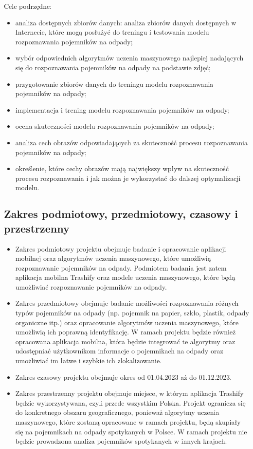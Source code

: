 \documentclass[12pt, a4paper, twoside, openany]{book}
\begin{document}
Cele podrzędne:
\begin{itemize}
    \item analiza dostępnych zbiorów danych: analiza zbiorów danych dostępnych w Internecie, które mogą posłużyć do treningu i testowania modelu rozpoznawania pojemników na odpady;
    \item wybór odpowiednich algorytmów uczenia maszynowego najlepiej nadających się do rozpoznawania pojemników na odpady na podstawie zdjęć;
    \item przygotowanie zbiorów danych do treningu modelu rozpoznawania pojemników na odpady;
    \item implementacja i trening modelu rozpoznawania pojemników na odpady;
    \item ocena skuteczności modelu rozpoznawania pojemników na odpady;
    \item analiza cech obrazów odpowiadających za skuteczność procesu rozpoznawania pojemników na odpady;
    \item określenie, które cechy obrazów mają największy wpływ na skuteczność procesu rozpoznawania i jak można je wykorzystać do dalszej optymalizacji modelu.
\end{itemize}

\subsection{Zakres podmiotowy, przedmiotowy, czasowy i przestrzenny}

\begin{itemize}
    \item Zakres podmiotowy projektu \topic  obejmuje badanie i opracowanie aplikacji mobilnej oraz algorytmów uczenia maszynowego, które umożliwią rozpoznawanie pojemników na odpady. Podmiotem badania jest zatem aplikacja mobilna Trashify oraz modele uczenia maszynowego, które będą umożliwiać rozpoznawanie pojemników na odpady.
    \item Zakres przedmiotowy obejmuje badanie możliwości rozpoznawania różnych typów pojemników na odpady (np. pojemnik na papier, szkło, plastik, odpady organiczne itp.) oraz opracowanie algorytmów uczenia maszynowego, które umożliwią ich poprawną identyfikację. W ramach projektu będzie również opracowana aplikacja mobilna, która będzie integrować te algorytmy oraz udostępniać użytkownikom informacje o pojemnikach na odpady oraz umożliwiać im łatwe i szybkie ich zlokalizowanie.
    \item Zakres czasowy projektu obejmuje okres od 01.04.2023 aż do 01.12.2023.
    \item Zakres przestrzenny projektu obejmuje miejsce, w którym aplikacja Trashify będzie wykorzystywana, czyli przede wszystkim Polska. Projekt ogranicza się do konkretnego obszaru geograficznego, ponieważ algorytmy uczenia maszynowego, które zostaną opracowane w ramach projektu, będą skupiały się na pojemnikach na odpady spotykanych w Polsce. W ramach projektu nie będzie prowadzona analiza pojemników spotykanych w innych krajach.
\end{itemize}
\end{document}
